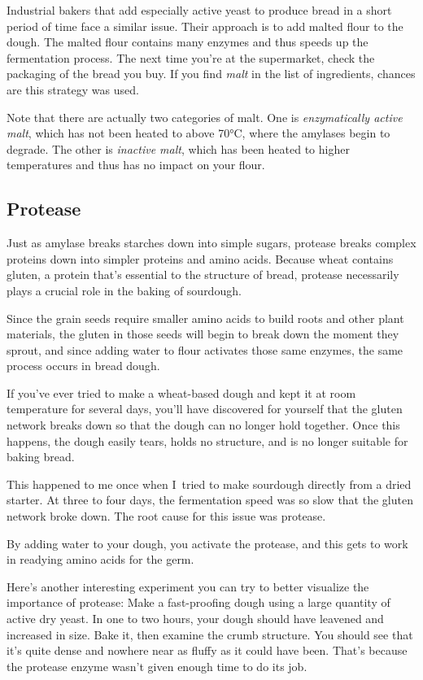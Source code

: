 Industrial bakers that add especially active yeast to produce bread in a short
period of time face a similar issue. Their approach is to add malted flour to
the dough. The malted flour contains many enzymes and thus speeds up the
fermentation process. The next time you're at the supermarket, check the
packaging of the bread you buy. If you find \emph{malt} in the list of
ingredients, chances are this strategy was used.

Note that there are actually two categories of malt. One is \emph{enzymatically
active malt}, which has not been heated to above 70°C, where the amylases begin
to degrade. The other is \emph{inactive malt}, which has been heated to higher
temperatures and thus has no impact on your flour.

\subsection{Protease}

Just as amylase breaks starches down into simple sugars, protease breaks
complex proteins down into simpler proteins and amino acids. Because wheat
contains gluten, a protein that's essential to the structure of bread,
protease necessarily plays a crucial role in the baking of sourdough.

Since the grain seeds require smaller amino acids to build roots and other
plant materials, the gluten in those seeds will begin to break down the moment
they sprout, and since adding water to flour activates those same enzymes,
the same process occurs in bread dough.

If you've ever tried to make a wheat-based dough and kept it at room
temperature for several days, you'll have discovered for yourself that the
gluten network breaks down so that the dough can no longer hold together. Once
this happens, the dough easily tears, holds no structure, and is no
longer suitable for baking bread.

This happened to me once when I~tried to make sourdough directly from a dried
starter. At three to four days, the fermentation speed was so slow that the
gluten network broke down. The root cause for this issue was protease.

By adding water to your dough, you activate the protease, and this gets to work
in readying amino acids for the germ.

Here's another interesting experiment you can try to better visualize the
importance of protease: Make a fast-proofing dough using a large quantity
of active dry yeast. In one to two hours, your dough should have leavened and
increased in size. Bake it, then examine the crumb structure. You should see
that it's quite dense and nowhere near as fluffy as it could have been. That's
because the protease enzyme wasn't given enough time to do its job.

